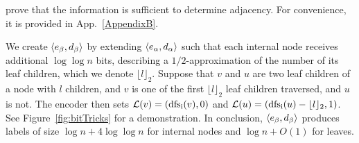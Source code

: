 %

 prove that the information is sufficient to determine adjacency.
For convenience, it is provided in App.~\ref{AppendixB}.

We create $\left \langle e_\beta,d_\beta \right \rangle $ by  extending $\left \langle e_\alpha,d_\alpha \right \rangle $ such that  each internal node  receives  additional $\log \log n$ bits, describing a   $1/2$-approximation  of  the number of  its leaf children, which we denote $\lfloor{l}\rfloor_2$.
Suppose  that $v$ and $u$ are two leaf children of a node with $l$ children, and $v$ is one of the first  $\lfloor{l}\rfloor_2$ leaf children  traversed, and $u$ is not.
The encoder then sets  $ \mathcal{L}(v) = (\operatorname{dfs_i}(v),0)$  and $ \mathcal{L}(u) = (\operatorname{dfs_i}(u)-\lfloor{l}\rfloor_2,1)$.
See Figure~\ref{fig:bitTricks} for  a demonstration.
In conclusion, $\left \langle e_\beta,d_\beta \right \rangle $ produces labels of size $\log n + 4 \log \log n$  for internal nodes and $\log n +O(1)$ for leaves.

